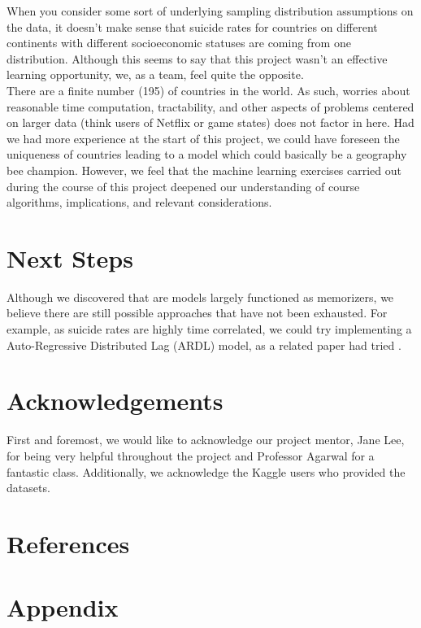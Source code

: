 \documentclass{article}
\begin{document}
\begin{multicols}{2}
When you consider some sort of underlying sampling distribution assumptions on the data, it doesn't make sense that suicide rates for countries on different continents with different socioeconomic statuses are coming from one distribution. Although this seems to say that this project wasn't an effective learning opportunity, we, as a team, feel quite the opposite. \\
There are a finite number (195) of countries in the world. As such, worries about reasonable time computation, tractability, and other aspects of problems centered on larger data (think users of Netflix or game states) does not factor in here. Had we had more experience at the start of this project, we could have foreseen the uniqueness of countries leading to a model which could basically be a geography bee champion. However, we feel that the machine learning exercises carried out during the course of this project deepened our understanding of course algorithms, implications, and relevant considerations.

\section{Next Steps} Although we discovered that are models largely functioned as memorizers, we believe there are still possible approaches that have not been exhausted. For example, as suicide rates are highly time correlated, we could try implementing a Auto-Regressive Distributed Lag (ARDL) model, as a related paper had tried . 

\section{Acknowledgements} First and foremost, we would like to acknowledge our project mentor, Jane Lee, for being very helpful throughout the project and Professor Agarwal for a fantastic class. Additionally, we acknowledge the Kaggle users who provided the datasets.

\end{multicols}

\pagebreak

\section{References} \theendnotes

\section{Appendix}
\end{document}
